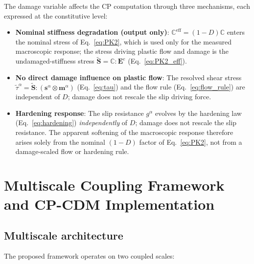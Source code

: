 \documentclass[12pt,a4paper,twocolumn]{article}
\begin{document}
The damage variable affects the CP computation through three mechanisms, each expressed at the constitutive level:
\begin{itemize}
    \item \textbf{Nominal stiffness degradation (output only)}: $\mathbb{C}^{\text{eff}} = (1-D)\mathbb{C}$ enters the nominal stress of Eq.~\eqref{eq:PK2}, which is used only for the measured macroscopic response; the stress driving plastic flow and damage is the undamaged-stiffness stress $\tilde{\mathbf{S}} = \mathbb{C}:\mathbf{E}^e$ (Eq.~\eqref{eq:PK2_eff}).
    \item \textbf{No direct damage influence on plastic flow}: The resolved shear stress $\tilde{\tau}^\alpha = \tilde{\mathbf{S}}:(\mathbf{s}^\alpha\otimes\mathbf{m}^\alpha)$ (Eq.~\eqref{eq:tau}) and the flow rule (Eq.~\eqref{eq:flow_rule}) are independent of $D$; damage does not rescale the slip driving force.
    \item \textbf{Hardening response}: The slip resistance $g^\alpha$ evolves by the hardening law (Eq.~\eqref{eq:hardening}) \emph{independently} of $D$; damage does not rescale the slip resistance. The apparent softening of the macroscopic response therefore arises solely from the nominal $(1-D)$ factor of Eq.~\eqref{eq:PK2}, not from a damage-scaled flow or hardening rule.
\end{itemize}

\section{Multiscale Coupling Framework and CP-CDM Implementation}
\label{sec:multiscale}

\subsection{Multiscale architecture}

The proposed framework operates on two coupled scales:
\end{document}
